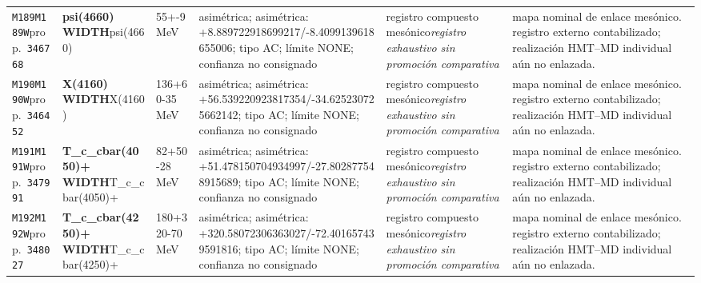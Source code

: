 \begin{landscape}
\begin{longtable}{L{1.85cm}L{4.45cm}L{2.35cm}L{4.05cm}L{3.35cm}L{7.15cm}}
\texttt{M189}\newline \texttt{M189W}\newline prop.\ \texttt{346768} & \textbf{psi(4660) WIDTH}\newline psi(4660) & 55+-9\,MeV & asimétrica; asimétrica: +8.889722918699217/-8.4099139618655006; tipo AC; límite NONE; confianza no consignado & registro compuesto mesónico\newline \emph{registro exhaustivo sin promoción comparativa} & mapa nominal de enlace mesónico. registro externo contabilizado; realización HMT--MD individual aún no enlazada. \\
\texttt{M190}\newline \texttt{M190W}\newline prop.\ \texttt{346452} & \textbf{X(4160) WIDTH}\newline X(4160) & 136+60-35\,MeV & asimétrica; asimétrica: +56.539220923817354/-34.625230725662142; tipo AC; límite NONE; confianza no consignado & registro compuesto mesónico\newline \emph{registro exhaustivo sin promoción comparativa} & mapa nominal de enlace mesónico. registro externo contabilizado; realización HMT--MD individual aún no enlazada. \\
\texttt{M191}\newline \texttt{M191W}\newline prop.\ \texttt{347991} & \textbf{T\_\allowbreak{}c\_\allowbreak{}cbar(4050)+ WIDTH}\newline T\_\allowbreak{}c\_\allowbreak{}cbar(4050)+ & 82+50-28\,MeV & asimétrica; asimétrica: +51.478150704934997/-27.802877548915689; tipo AC; límite NONE; confianza no consignado & registro compuesto mesónico\newline \emph{registro exhaustivo sin promoción comparativa} & mapa nominal de enlace mesónico. registro externo contabilizado; realización HMT--MD individual aún no enlazada. \\
\texttt{M192}\newline \texttt{M192W}\newline prop.\ \texttt{348027} & \textbf{T\_\allowbreak{}c\_\allowbreak{}cbar(4250)+ WIDTH}\newline T\_\allowbreak{}c\_\allowbreak{}cbar(4250)+ & 180+320-70\,MeV & asimétrica; asimétrica: +320.58072306363027/-72.401657439591816; tipo AC; límite NONE; confianza no consignado & registro compuesto mesónico\newline \emph{registro exhaustivo sin promoción comparativa} & mapa nominal de enlace mesónico. registro externo contabilizado; realización HMT--MD individual aún no enlazada. \\

\end{longtable}
\end{landscape}
